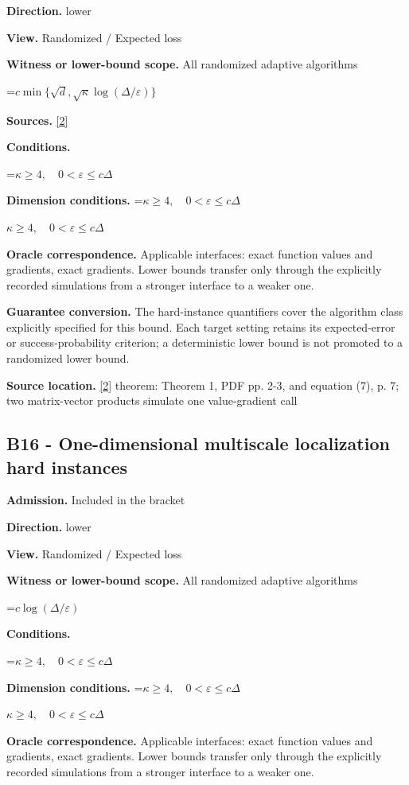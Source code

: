 \documentclass[10pt,a4paper]{article}
\newcommand{\AtlasMath}[1]{\par\begingroup\centering\setbox0=\hbox{$\displaystyle #1$}\ifdim\wd0>1.4\linewidth\typeout{ATLAS WIDE FORMULA: \the\wd0}\fi\ifdim\wd0>\linewidth\resizebox{\linewidth}{!}{\box0}\else\box0\fi\par\endgroup}
\newcommand{\AtlasInlineMath}[1]{\begingroup\setbox0=\hbox{$#1$}\ifdim\wd0>.4\linewidth\endgroup\AtlasMath{#1}\else\endgroup$#1$\fi}
\begin{document}
\textbf{Direction.} lower

\textbf{View.} Randomized / Expected loss

\textbf{Witness or lower-bound scope.} All randomized adaptive algorithms

\AtlasMath{c\min\{\sqrt d,\sqrt\kappa\log(\Delta/\varepsilon)\}}
\textbf{Sources.} \href{https://arxiv.org/pdf/2609.10874}{[2]}

\textbf{Conditions.} 
\AtlasMath{\kappa\ge4,\quad0<\varepsilon\le c\Delta}


\textbf{Dimension conditions.} \AtlasInlineMath{\kappa\ge4,\quad0<\varepsilon\le c\Delta}

\textbf{Oracle correspondence.} Applicable interfaces: exact function values and gradients, exact gradients. Lower bounds transfer only through the explicitly recorded simulations from a stronger interface to a weaker one.

\textbf{Guarantee conversion.} The hard-instance quantifiers cover the algorithm class explicitly specified for this bound. Each target setting retains its expected-error or success-probability criterion; a deterministic lower bound is not promoted to a randomized lower bound.

\textbf{Source location.} \href{https://arxiv.org/pdf/2609.10874}{[2]} theorem: Theorem 1, PDF pp. 2-3, and equation (7), p. 7; two matrix-vector products simulate one value-gradient call

\subsection{B16 - One-dimensional multiscale localization hard instances}
\textbf{Admission.} Included in the bracket

\textbf{Direction.} lower

\textbf{View.} Randomized / Expected loss

\textbf{Witness or lower-bound scope.} All randomized adaptive algorithms

\AtlasMath{c\log(\Delta/\varepsilon)}
\textbf{Conditions.} 
\AtlasMath{\kappa\ge4,\quad0<\varepsilon\le c\Delta}


\textbf{Dimension conditions.} \AtlasInlineMath{\kappa\ge4,\quad0<\varepsilon\le c\Delta}

\textbf{Oracle correspondence.} Applicable interfaces: exact function values and gradients, exact gradients. Lower bounds transfer only through the explicitly recorded simulations from a stronger interface to a weaker one.
\end{document}
